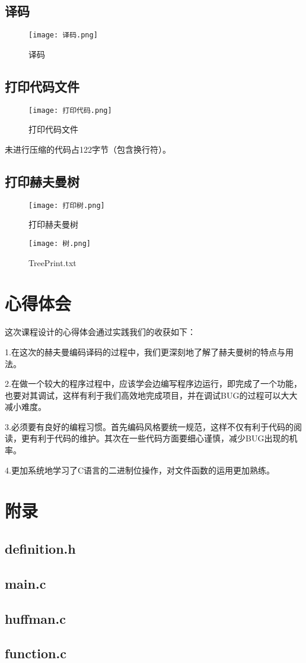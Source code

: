 \documentclass{DateStructure}
\begin{document}
\subsection{译码}
\begin{figure}[H] 
\centering
\texttt{[image: 译码.png]}
\caption{译码}	
\end{figure}

\subsection{打印代码文件}
\begin{figure}[H] 
\centering
\texttt{[image: 打印代码.png]}
\caption{打印代码文件}	
\end{figure}
未进行压缩的代码占122字节（包含换行符）。

\subsection{打印赫夫曼树}
\begin{figure}[H] 
\centering
\texttt{[image: 打印树.png]}
\caption{打印赫夫曼树}	
\end{figure}
\begin{figure}[H] 
\centering
\texttt{[image: 树.png]}
\caption{TreePrint.txt}	
\end{figure}

\section{心得体会}
这次课程设计的心得体会通过实践我们的收获如下：\par
1.在这次的赫夫曼编码译码的过程中，我们更深刻地了解了赫夫曼树的特点与用法。\par
2.在做一个较大的程序过程中，应该学会边编写程序边运行，即完成了一个功能，也要对其调试，这样有利于我们高效地完成项目，并在调试BUG的过程可以大大减小难度。\par
3.必须要有良好的编程习惯。首先编码风格要统一规范，这样不仅有利于代码的阅读，更有利于代码的维护。其次在一些代码方面要细心谨慎，减少BUG出现的机率。\par
4.更加系统地学习了C语言的二进制位操作，对文件函数的运用更加熟练。

\newpage 
\section{附录}
\subsection{definition.h}

\subsection{main.c}

\subsection{huffman.c}

\subsection{function.c}

\end{document}
